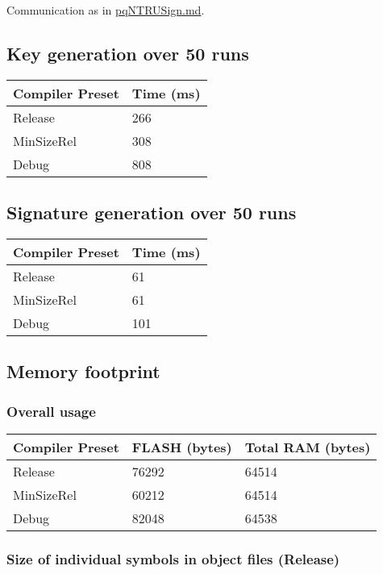\documentclass[
]{article}
\begin{document}
Communication as in \url{pqNTRUSign.md}.

\hypertarget{key-generation-over-50-runs}{%
\subsection{Key generation over 50
runs}\label{key-generation-over-50-runs}}

\begin{longtable}[]{@{}ll@{}}
\toprule
Compiler Preset & Time (ms)\tabularnewline
\midrule
\endhead
Release & 266\tabularnewline
MinSizeRel & 308\tabularnewline
Debug & 808\tabularnewline
\bottomrule
\end{longtable}

\hypertarget{signature-generation-over-50-runs}{%
\subsection{Signature generation over 50
runs}\label{signature-generation-over-50-runs}}

\begin{longtable}[]{@{}ll@{}}
\toprule
Compiler Preset & Time (ms)\tabularnewline
\midrule
\endhead
Release & 61\tabularnewline
MinSizeRel & 61\tabularnewline
Debug & 101\tabularnewline
\bottomrule
\end{longtable}

\hypertarget{memory-footprint-1}{%
\subsection{Memory footprint}\label{memory-footprint-1}}

\hypertarget{overall-usage-1}{%
\subsubsection{Overall usage}\label{overall-usage-1}}

\begin{longtable}[]{@{}lll@{}}
\toprule
Compiler Preset & FLASH (bytes) & Total RAM (bytes)\tabularnewline
\midrule
\endhead
Release & 76292 & 64514\tabularnewline
MinSizeRel & 60212 & 64514\tabularnewline
Debug & 82048 & 64538\tabularnewline
\bottomrule
\end{longtable}

\hypertarget{size-of-individual-symbols-in-object-files-release}{%
\subsubsection{Size of individual symbols in object files
(Release)}\label{size-of-individual-symbols-in-object-files-release}}
\end{document}
